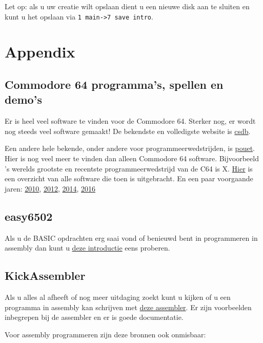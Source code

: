 \documentclass{article}
\begin{document}
Let op: als u uw creatie wilt opslaan dient u een nieuwe disk aan te sluiten en kunt u het opslaan via \verb:1 main->7 save intro:.

\section{Appendix}

\subsection{Commodore 64 programma's, spellen en demo's}

Er is heel veel software te vinden voor de Commodore 64.
Sterker nog, er wordt nog steeds veel software gemaakt!
De bekendste en volledigste website is \href{http://csdb.dk}{csdb}.

Een andere hele bekende, onder andere voor programmeerwedstrijden, is \href{https://www.pouet.net}{pouet}.
Hier is nog veel meer te vinden dan alleen Commodore 64 software.
Bijvoorbeeld 's werelds grootste en recentste programmeerwedstrijd van de C64 is X.
\href{https://www.pouet.net/party.php?which=50&when=2018}{Hier} is een overzicht van alle software die toen is uitgebracht.
En een paar voorgaande jaren: \href{https://www.pouet.net/party.php?which=50&when=2010}{2010}, \href{https://www.pouet.net/party.php?which=50&when=2012}{2012}, \href{https://www.pouet.net/party.php?which=50&when=2014}{2014}, \href{https://www.pouet.net/party.php?which=50&when=2016}{2016}

\subsection{easy6502}

Als u de BASIC opdrachten erg saai vond of benieuwd bent in programmeren in assembly dan kunt u \href{https://skilldrick.github.io/easy6502/}{deze introductie} eens proberen.

\subsection{KickAssembler}

Als u alles al afheeft of nog meer uitdaging zoekt kunt u kijken of u een programma in assembly kan schrijven met \href{http://theweb.dk/KickAssembler/Main.html#frontpage}{deze assembler}.
Er zijn voorbeelden inbegrepen bij de assembler en er is goede documentatie.

Voor assembly programmeren zijn deze bronnen ook onmisbaar:
\end{document}
